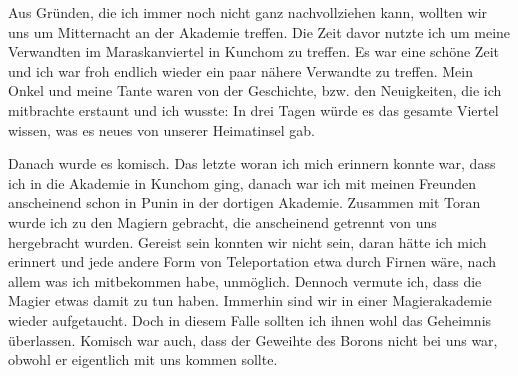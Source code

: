Aus Gründen, die ich immer noch nicht ganz nachvollziehen kann, wollten wir uns um Mitternacht an der Akademie treffen. Die Zeit davor nutzte ich um meine Verwandten im Maraskanviertel in Kunchom zu treffen. Es war eine schöne Zeit und ich war froh endlich wieder ein paar nähere Verwandte zu treffen. Mein Onkel und meine Tante waren von der Geschichte, bzw. den Neuigkeiten, die ich mitbrachte erstaunt und ich wusste: In drei Tagen würde es das gesamte Viertel wissen, was es neues von unserer Heimatinsel gab.

Danach wurde es komisch. Das letzte woran ich mich erinnern konnte war, dass ich in die Akademie in Kunchom ging, danach war ich mit meinen Freunden anscheinend schon in Punin in der dortigen Akademie. Zusammen mit Toran wurde ich zu den Magiern gebracht, die anscheinend getrennt von uns hergebracht wurden. Gereist sein konnten wir nicht sein, daran hätte ich mich erinnert und jede andere Form von Teleportation etwa durch Firnen wäre, nach allem was ich mitbekommen habe, unmöglich. Dennoch vermute ich, dass die Magier etwas damit zu tun haben. Immerhin sind wir in einer Magierakademie wieder aufgetaucht. Doch in diesem Falle sollten ich ihnen wohl das Geheimnis überlassen. Komisch war auch, dass der Geweihte des Borons nicht bei uns war, obwohl er eigentlich mit uns kommen sollte. 

